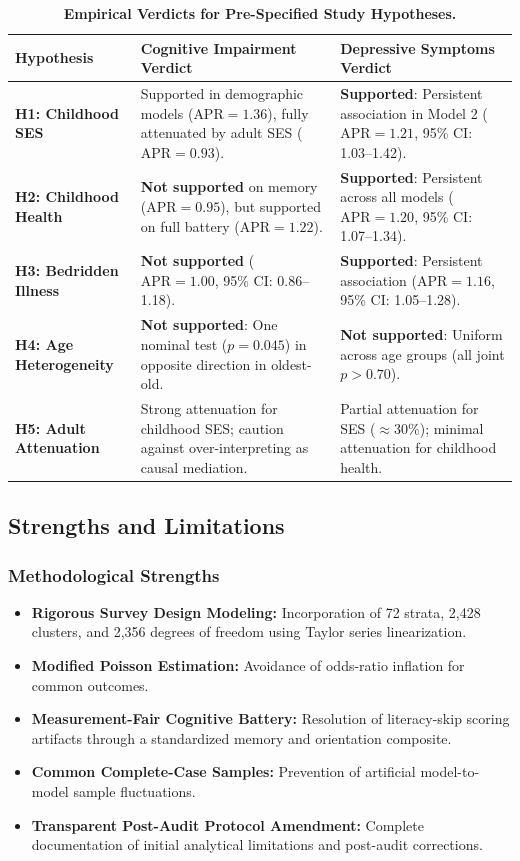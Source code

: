 \documentclass[11pt,a4paper]{article}
\begin{document}
\begin{table}[H]
\centering
\small
\caption{\textbf{Empirical Verdicts for Pre-Specified Study Hypotheses.}}
\label{tab:hypo_summary}
\begin{tabularx}{\textwidth}{lXX}
\toprule
\textbf{Hypothesis} & \textbf{Cognitive Impairment Verdict} & \textbf{Depressive Symptoms Verdict} \\
\midrule
\textbf{H1: Childhood SES} & Supported in demographic models ($\text{APR}=1.36$), fully attenuated by adult SES ($\text{APR}=0.93$). & \textbf{Supported}: Persistent association in Model 2 ($\text{APR}=1.21$, 95\% CI: 1.03--1.42). \\
\addlinespace
\textbf{H2: Childhood Health} & \textbf{Not supported} on memory ($\text{APR}=0.95$), but supported on full battery ($\text{APR}=1.22$). & \textbf{Supported}: Persistent across all models ($\text{APR}=1.20$, 95\% CI: 1.07--1.34). \\
\addlinespace
\textbf{H3: Bedridden Illness} & \textbf{Not supported} ($\text{APR}=1.00$, 95\% CI: 0.86--1.18). & \textbf{Supported}: Persistent association ($\text{APR}=1.16$, 95\% CI: 1.05--1.28). \\
\addlinespace
\textbf{H4: Age Heterogeneity} & \textbf{Not supported}: One nominal test ($p=0.045$) in opposite direction in oldest-old. & \textbf{Not supported}: Uniform across age groups (all joint $p > 0.70$). \\
\addlinespace
\textbf{H5: Adult Attenuation} & Strong attenuation for childhood SES; caution against over-interpreting as causal mediation. & Partial attenuation for SES ($\approx 30\%$); minimal attenuation for childhood health. \\
\bottomrule
\end{tabularx}
\end{table}

\subsection{Strengths and Limitations}
\subsubsection{Methodological Strengths}
\begin{itemize}
    \item \textbf{Rigorous Survey Design Modeling:} Incorporation of 72 strata, 2,428 clusters, and 2,356 degrees of freedom using Taylor series linearization.
    \item \textbf{Modified Poisson Estimation:} Avoidance of odds-ratio inflation for common outcomes.
    \item \textbf{Measurement-Fair Cognitive Battery:} Resolution of literacy-skip scoring artifacts through a standardized memory and orientation composite.
    \item \textbf{Common Complete-Case Samples:} Prevention of artificial model-to-model sample fluctuations.
    \item \textbf{Transparent Post-Audit Protocol Amendment:} Complete documentation of initial analytical limitations and post-audit corrections.
\end{itemize}
\end{document}
